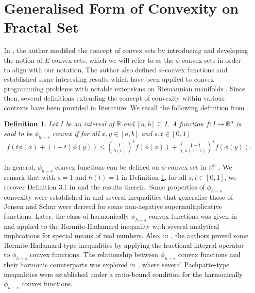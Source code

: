 \documentclass[10pt]{article}
\newtheorem{df}[theo]{Definition}
\begin{document}
\section{Generalised Form of Convexity on Fractal Set}
In \cite{youn}, the author modified the concept of convex sets by introducing and developing the notion of $E$-convex sets, which we will refer to as the $\phi$-convex sets in order to align with our notation.  The author also defined $\phi$-convex functions \cite{youn} and established some interesting results which have been applied to convex programming problems  \cite{ant, fajardo, piao, syau} with notable extensions on Riemannian manifolds \cite{iqbal, kili}. Since then, several definitions extending the concept of convexity within various contexts have been provided in literature. 
 We recall the following definition from \cite{peterf}.
\begin{df}\label{fdg}
Let $I$ be an interval of $\mathbb{R}$ and $[a,b]\subseteq I$. A function $f:I\rightarrow \mathbb{R}^\alpha$ is said to be  $\phi_{h-s}$ convex if for all $x,y\in [a,b]$ and $s,t\in[0,1]$
\begin{align}
f(t\phi(x)+ (1-t)\phi(y)) \leq \left ( \frac{t}{h(t)} \right)^{ s} f(\phi(x)) + \left ( \frac{1-t}{h(1-t)} \right)^{s} f(\phi(y)).  \nonumber
\end{align}
\end{df}










In general, $\phi_{h-s}$ convex functions can be defined on $\phi$-convex set in $\mathbb{R}^n$ \cite{youn}. We remark that with $s=1$ and $h(t)=1$ in Definition \ref{fdg}, for all $s,t\in[0,1]$, we recover Definition 3.1 in \cite{youn} and the results therein.  Some properties of $\phi_{h-s}$ convexity were established in \cite{peterf} and several inequalities that generalise those of Jensen and Schur  were derived for some non-negative supermultiplicative functions. Later, the class of harmonically $\phi_{h-s}$ convex functions was given in \cite{peterfacta} and applied to the Hermite-Hadamard inequality with several analytical implications for special means of real numbers. Also, in \cite{peterfacta}, the authors proved some Hermite-Hadamard-type inequalities by applying the fractional integral operator to $\phi_{h-s}$ convex functions. The relationship between $\phi_{h-s}$ convex functions and their harmonic counterparts was explored in \cite{ojo}, where several Pachpatte-type inequalities were established under a ratio-bound condition for the harmonically $\phi_{h-s}$ convex functions.
\end{document}
